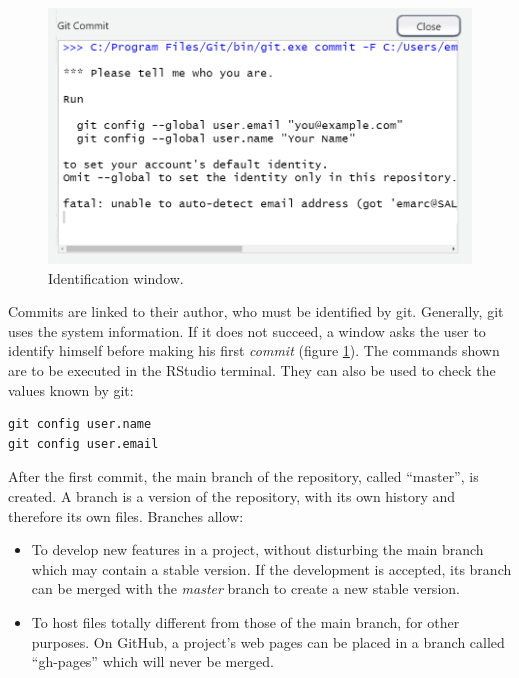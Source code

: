 \documentclass[
  12pt,
  american,
  a4paper,
  extrafontsizes,onecolumn,openright
  ]{memoir}
\providecommand{\tightlist}{%
  \setlength{\itemsep}{0pt}\setlength{\parskip}{0pt}}
\begin{document}
\begin{figure}

{\centering \includegraphics[width=0.8\linewidth]{images/git-id} 

}

\caption{Identification window.}\label{fig:git-id}
\end{figure}

\normalsize

Commits are linked to their author, who must be identified by git.
Generally, git uses the system information.
If it does not succeed, a window asks the user to identify himself before making his first \emph{commit} (figure \ref{fig:git-id}).
The commands shown are to be executed in the RStudio terminal.
They can also be used to check the values known by git:

\begin{verbatim}
git config user.name
git config user.email
\end{verbatim}

After the first commit, the main branch of the repository, called \enquote{master}, is created.
A branch is a version of the repository, with its own history and therefore its own files.
Branches allow:

\begin{itemize}
\tightlist
\item
  To develop new features in a project, without disturbing the main branch which may contain a stable version.
  If the development is accepted, its branch can be merged with the \emph{master} branch to create a new stable version.
\item
  To host files totally different from those of the main branch, for other purposes.
  On GitHub, a project's web pages can be placed in a branch called \enquote{gh-pages} which will never be merged.
\end{itemize}
\end{document}

